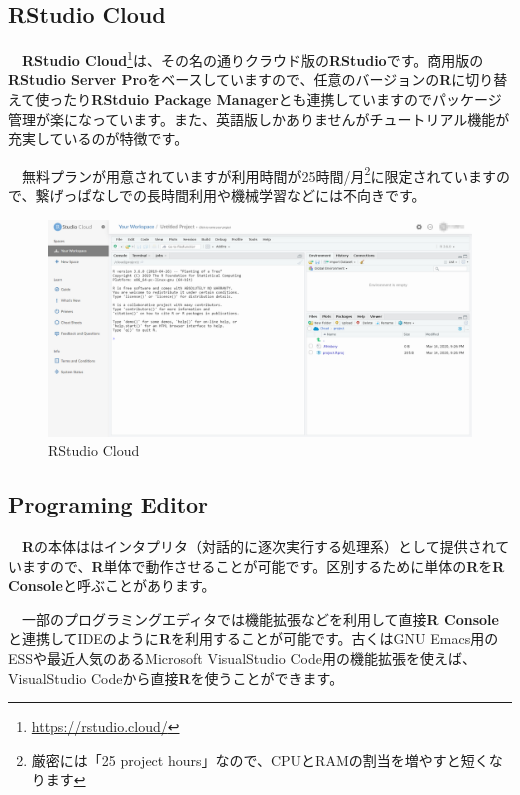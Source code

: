 \documentclass[
  12pt,
]{book}
\DeclareRobustCommand{\href}[2]{#2\footnote{\url{#1}}}
\begin{document}
\hypertarget{rstudio-cloud}{%
\subsection{\texorpdfstring{RStudio Cloud}{RStudio Cloud}}\label{rstudio-cloud}}

　\href{https://rstudio.cloud/}{\textbf{RStudio Cloud}}は、その名の通りクラウド版の\textbf{RStudio}です。商用版の\textbf{RStudio Server Pro}をベースしていますので、任意のバージョンの\textbf{R}に切り替えて使ったり\textbf{RStduio Package Manager}とも連携していますのでパッケージ管理が楽になっています。また、英語版しかありませんがチュートリアル機能が充実しているのが特徴です。

　無料プランが用意されていますが利用時間が25時間/月\footnote{厳密には「25 project hours」なので、CPUとRAMの割当を増やすと短くなります}に限定されていますので、繋げっぱなしでの長時間利用や機械学習などには不向きです。

\begin{figure}[H]

{\centering \includegraphics[width=0.9\linewidth,]{./fig/RStudio/RSCloud_01} 

}

\caption{RStudio Cloud}\label{fig:unnamed-chunk-18}
\end{figure}

\hypertarget{programing-editor}{%
\subsection{Programing Editor}\label{programing-editor}}

　\textbf{R}の本体ははインタプリタ（対話的に逐次実行する処理系）として提供されていますので、\textbf{R}単体で動作させることが可能です。区別するために単体の\textbf{R}を\textbf{R Console}と呼ぶことがあります。

　一部のプログラミングエディタでは機能拡張などを利用して直接\textbf{R Console}と連携してIDEのように\textbf{R}を利用することが可能です。古くはGNU Emacs用のESSや最近人気のあるMicrosoft VisualStudio Code用の機能拡張を使えば、VisualStudio Codeから直接\textbf{R}を使うことができます。
\end{document}
